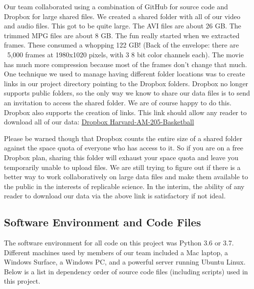 \documentclass{article}
\begin{document}
Our team collaborated using a combination of GitHub for source code and Dropbox for large shared files.
We created a shared folder with all of our video and audio files.  This got to be quite large.
The AVI files are about 26 GB.  The trimmed MPG files are about 8 GB.  
The fun really started when we extracted frames.  These consumed a whopping 122 GB!
(Back of the envelope: there are ~5,000 frames at 1980x1020 pixels, with 3 8 bit color channels each).
The movie has much more compression because most of the frames don't change that much.
One technique we used to manage having different folder locations was to create links in our
project directory pointing to the Dropbox folders.  
Dropbox no longer supports public folders, so the only way we know to share our data files
is to send an invitation to access the shared folder.  We are of course happy to do this.
Dropbox also supports the creation of links.  This link should allow any reader to download all of our data:
\href{https://www.dropbox.com/sh/kdvbl0sfw9lckff/AABTEYhBnZ7FPw6Ku5Bznjkea?dl=0}{Dropbox Harvard-AM-205-Basketball}

Please be warned though that Dropbox counts the entire size of a shared folder against the
space quota of everyone who has access to it.  So if you are on a free Dropbox plan, 
sharing this folder will exhaust your space quota and leave you temporarily unable to upload files.
We are still trying to figure out if there is a better way to work collaboratively on large data files
and make them available to the public in the interests of replicable science.
In the interim, the ability of any reader to download our data via the above link is satisfactory if not ideal.

\newpage
\subsection{Software Environment and Code Files}
The software environment for all code on this project was Python 3.6 or 3.7.
Different machines used by members of our team included a Mac laptop, a Windows Surface, 
a Windows PC, and a powerful server running Ubuntu Linux.  
Below is a list in dependency order of source code files (including scripts) used in this project.
\end{document}
